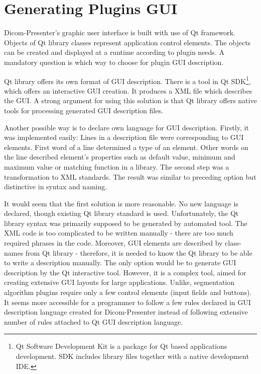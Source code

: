 \section{Generating Plugins GUI}

Dicom-Presenter's graphic user interface is built with use of Qt framework. Objects of Qt library classes represent application control elements. The objects can be created and displayed at a runtime according to plugin needs. A mandatory question is which way to choose for plugin GUI description.

Qt library offers its own format of GUI description. There is a tool in Qt SDK\footnote{Qt Software Development Kit is a package for Qt based applications development. SDK includes library files together with a native development IDE.}, which offers an interactive GUI creation. It produces a XML file which describes the GUI. A strong argument for using this solution is that Qt library offers native tools for processing generated GUI description files.

Another possible way is to declare own language for GUI description. Firstly, it was implemented easily: Lines in a description file were corresponding to GUI elements. First word of a line determined a type of an element. Other words on the line described element's properties such as default value, minimum and maximum value or matching function in a library. The second step was a transformation to XML standards. The result was similar to preceding option but distinctive in syntax and naming. 

It would seem that the first solution is more reasonable. No new language is declared, though existing Qt library standard is used. Unfortunately, the Qt library syntax was primarily supposed to be generated by automated tool. The XML code is too complicated to be written manually - there are too much required phrases in the code. Moreover, GUI elements are described by class-names from Qt library - therefore, it is needed to know the Qt library to be able to write a description manually. The only option would be to generate GUI description by the Qt interactive tool. However, it is a complex tool, aimed for creating extensive GUI layouts for large applications. Unlike, segmentation algorithm plugins require only a few control elements (input fields and buttons). It seems more accessible for a programmer to follow a few rules declared in GUI description language created for Dicom-Presenter instead of following extensive number of rules attached to Qt GUI description language.

